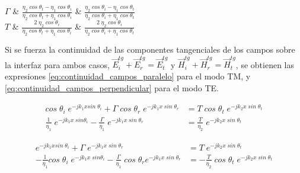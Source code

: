\begin{table}
\begin{tabu}
		$\Gamma$
		&
		$\frac{\eta_2\; cos\; \theta_t - \eta_1 \; cos\; \theta_i}{\eta_2\; cos\; \theta_t + \eta_1 \; cos\; \theta_i}$
		&
		$\frac{\eta_2\; cos\; \theta_i - \eta_1 \; cos\; \theta_t}{\eta_2\; cos\; \theta_i + \eta_1 \; cos\; \theta_t}$
		\\
		$T$
		&
		$\frac{2 \;\eta_2 \; cos\; \theta_i}{\eta_2\; cos\; \theta_t + \eta_1 \; cos\; \theta_i}$
		&
		$\frac{2\; \eta_2 \; cos\; \theta_i}{\eta_2\; cos\; \theta_i + \eta_1 \; cos\; \theta_t}$
	\end{tabu}
	\caption{Campos incidentes, transmitidos y reflejados, y coeficientes de reflexión y transmisión para incidencia oblicua de una onda plana sobre una interfaz dieléctrica}
	\label{table:incidencia_oblicua}
\end{table}

Si se fuerza la continuidad de las componentes tangenciales de los campos sobre la interfaz para ambos casos, $\vec{E}_i^{tg} + \vec{E}_r^{tg} = \vec{E}_t^{tg}$ y $\vec{H}_i^{tg} + \vec{H}_r^{tg} = \vec{H}_t^{tg}$, se obtienen las expresiones \ref{eq:continuidad_campos_paralelo} para el modo TM, y \ref{eq:continuidad_campos_perpendicular} para el modo TE.

\begin{subequations}
	\label{eq:continuidad_campos_paralelo}
	\begin{align}
		cos \; \theta_i \; e^{-j k_1 x sin \; \theta_i} + \Gamma \; cos \; \theta_r \; e^{-j k_1 x \; sin\; \theta_r} &= T\; cos\; \theta_t \; e^{-j k_2 x \; sin\; \theta_t}\\
		\frac{1}{\eta_1} \; e^{-j k_1 x \; sin \theta_i} - \frac{\Gamma}{\eta_1} \; e^{-j k_1 x \; sin \; \theta_r} &= \frac{T}{\eta_2} \; e^{-j k_2 x \; sin\; \theta_t}
	\end{align}
\end{subequations}

\begin{subequations}
	\label{eq:continuidad_campos_perpendicular}
	\begin{align}
	e^{-j k_1 x sin \; \theta_i} + \Gamma \; e^{-j k_1 x \; sin\; \theta_r} &= T\; e^{-j k_2 x \; sin\; \theta_t}\\
	-\frac{1}{\eta_1} cos\; \theta_i \; e^{-j k_1 x \; sin \theta_i} - \frac{\Gamma}{\eta_1} \; cos\; \theta_r e^{-j k_1 x \; sin \; \theta_r} &= -\frac{T}{\eta_2} \; cos\; \theta_t \; e^{-j k_2 x \; sin\; \theta_t}
	\end{align}
\end{subequations}

